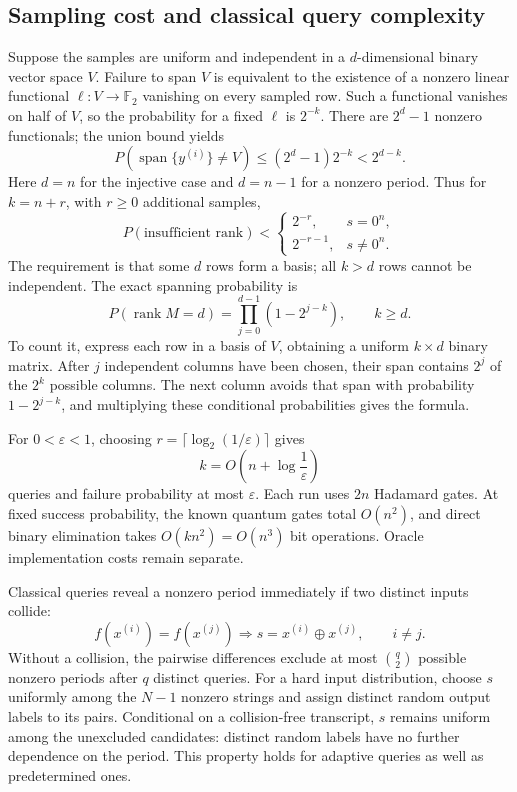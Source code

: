 \documentclass[11pt,oneside,openany]{book}
\newcommand{\Ftwo}{\mathbb F_2}
\DeclareMathOperator{\rank}{rank}
\theoremstyle{definition}
\begin{document}
\subsection{Sampling cost and classical query complexity}
Suppose the samples are uniform and independent in a $d$-dimensional binary vector space $V$. Failure to span $V$ is equivalent to the existence of a nonzero linear functional $\ell:V\to\Ftwo$ vanishing on every sampled row. Such a functional vanishes on half of $V$, so the probability for a fixed $\ell$ is $2^{-k}$. There are $2^d-1$ nonzero functionals; the union bound yields
\begin{equation}
 P(\operatorname{span}\{y^{(i)}\}\ne V)
 \le(2^d-1)2^{-k}<2^{d-k}.
 \label{eq:simon-failure-union}
\end{equation}
Here $d=n$ for the injective case and $d=n-1$ for a nonzero period. Thus for $k=n+r$, with $r\ge0$ additional samples,
\begin{equation}
 P(\text{insufficient rank})<
 \begin{cases}2^{-r},&s=0^n,\\2^{-r-1},&s\ne0^n.
 \end{cases}
\end{equation}
The requirement is that some $d$ rows form a basis; all $k>d$ rows cannot be independent. The exact spanning probability is
\begin{equation}
 P(\rank M=d)=\prod_{j=0}^{d-1}(1-2^{j-k}),\qquad k\ge d.
 \label{eq:simon-full-rank-prob}
\end{equation}
To count it, express each row in a basis of $V$, obtaining a uniform $k\times d$ binary matrix. After $j$ independent columns have been chosen, their span contains $2^j$ of the $2^k$ possible columns. The next column avoids that span with probability $1-2^{j-k}$, and multiplying these conditional probabilities gives the formula.

For $0<\varepsilon<1$, choosing $r=\lceil\log_2(1/\varepsilon)\rceil$ gives
\begin{equation}
 k=O\!\left(n+\log\frac1\varepsilon\right)
\end{equation}
queries and failure probability at most $\varepsilon$. Each run uses $2n$ Hadamard gates. At fixed success probability, the known quantum gates total $O(n^2)$, and direct binary elimination takes $O(kn^2)=O(n^3)$ bit operations. Oracle implementation costs remain separate.

Classical queries reveal a nonzero period immediately if two distinct inputs collide:
\begin{equation}
 f(x^{(i)})=f(x^{(j)})\Longrightarrow s=x^{(i)}\oplus x^{(j)},\qquad i\ne j.
\end{equation}
Without a collision, the pairwise differences exclude at most $\binom q2$ possible nonzero periods after $q$ distinct queries. For a hard input distribution, choose $s$ uniformly among the $N-1$ nonzero strings and assign distinct random output labels to its pairs. Conditional on a collision-free transcript, $s$ remains uniform among the unexcluded candidates: distinct random labels have no further dependence on the period. This property holds for adaptive queries as well as predetermined ones.
\end{document}
